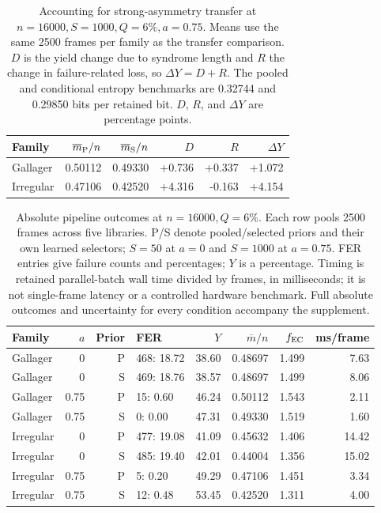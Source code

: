 \begin{table}[!htbp]
\centering
\small\setlength{\tabcolsep}{4pt}
\caption{Accounting for strong-asymmetry transfer at $n=16000,S=1000,Q=6\%,a=0.75$. Means use the same 2500 frames per family as the transfer comparison. $D$ is the yield change due to syndrome length and $R$ the change in failure-related loss, so $\Delta Y=D+R$. The pooled and conditional entropy benchmarks are 0.32744 and 0.29850 bits per retained bit. $D$, $R$, and $\Delta Y$ are percentage points.}
\label{tab:yieldaccounting}
\begin{tabular}{@{}lrrrrr@{}}
\toprule
Family & $\overline m_{\rm P}/n$ & $\overline m_{\rm S}/n$ & $D$ & $R$ & $\Delta Y$ \\
\midrule
Gallager & 0.50112 & 0.49330 & +0.736 & +0.337 & +1.072 \\
Irregular & 0.47106 & 0.42520 & +4.316 & -0.163 & +4.154 \\
\bottomrule
\end{tabular}
\end{table}

\begin{table}[!htbp]
\centering
\small\setlength{\tabcolsep}{4pt}
\caption{Absolute pipeline outcomes at $n=16000,Q=6\%$. Each row pools 2500 frames across five libraries. P/S denote pooled/selected priors and their own learned selectors; $S=50$ at $a=0$ and $S=1000$ at $a=0.75$. FER entries give failure counts and percentages; $Y$ is a percentage. Timing is retained parallel-batch wall time divided by frames, in milliseconds; it is not single-frame latency or a controlled hardware benchmark. Full absolute outcomes and uncertainty for every condition accompany the supplement.}
\label{tab:absolutetransfer}
\begin{tabular}{@{}lrrlrrrr@{}}
\toprule
Family & $a$ & Prior & FER & $Y$ & $\overline m/n$ & $f_{\rm EC}$ & ms/frame \\
\midrule
Gallager & 0 & P & 468: 18.72 & 38.60 & 0.48697 & 1.499 & 7.63 \\
Gallager & 0 & S & 469: 18.76 & 38.57 & 0.48697 & 1.499 & 8.06 \\
Gallager & 0.75 & P & 15: 0.60 & 46.24 & 0.50112 & 1.543 & 2.11 \\
Gallager & 0.75 & S & 0: 0.00 & 47.31 & 0.49330 & 1.519 & 1.60 \\
Irregular & 0 & P & 477: 19.08 & 41.09 & 0.45632 & 1.406 & 14.42 \\
Irregular & 0 & S & 485: 19.40 & 42.01 & 0.44004 & 1.356 & 15.02 \\
Irregular & 0.75 & P & 5: 0.20 & 49.29 & 0.47106 & 1.451 & 3.34 \\
Irregular & 0.75 & S & 12: 0.48 & 53.45 & 0.42520 & 1.311 & 4.00 \\
\bottomrule
\end{tabular}
\end{table}

